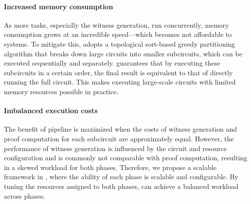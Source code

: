 \paragraph{Increased memory consumption} As more tasks, especially the witness generation, run concurrently, memory consumption grows at an incredible speed—which becomes not affordable to systems. To mitigate this, \system adopts a topological sort-based greedy partitioning algorithm that breaks down large circuits into smaller subcircuits, which can be executed sequentially and separately.  \system guarantees that by executing these subcircuits in a certain order, the final result is equivalent to that of directly running the full circuit. This makes executing large-scale circuits with limited memory resources possible in practice. 




\paragraph{Imbalanced execution costs}
The benefit of pipeline is maximized when the costs of witness generation and proof computation for each subcircuit are approximately equal. However, the performance of witness generation is influenced by the circuit and resource configuration and is commonly not comparable with proof computation, resulting in a skewed workload for both phases. Therefore, we propose a scalable framework in \system, where the ability of each phase is scalable and configurable. By tuning the resources assigned to both phases, \system can achieve a balanced workload across phases. 


